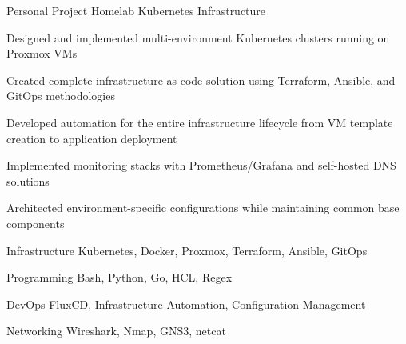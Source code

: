 \documentclass[11pt, letterpaper]{awesome-cv}
\begin{document}
\begin{cventries}
\end{cventries}


\begin{cventries}

\cventry
    {Personal Project}
    {Homelab Kubernetes Infrastructure \href{https://github.com/sfcal/homelab}{\faGithub}}
    {}
    {}
    {
      \begin{cvitems}
        \item {Designed and implemented multi-environment Kubernetes clusters running on Proxmox VMs}
        \item {Created complete infrastructure-as-code solution using Terraform, Ansible, and GitOps methodologies}
        \item {Developed automation for the entire infrastructure lifecycle from VM template creation to application deployment}
        \item {Implemented monitoring stacks with Prometheus/Grafana and self-hosted DNS solutions}
        \item {Architected environment-specific configurations while maintaining common base components}
      \end{cvitems}
    }

\end{cventries}


\begin{cvskills}

  \cvskill
    {Infrastructure}
    {Kubernetes, Docker, Proxmox, Terraform, Ansible, GitOps}

  \cvskill
    {Programming}
    {Bash, Python, Go, HCL, Regex}

  \cvskill
    {DevOps}
    {FluxCD, Infrastructure Automation, Configuration Management}

  \cvskill
    {Networking}
    {Wireshark, Nmap, GNS3, netcat}

\end{cvskills}
\end{document}
